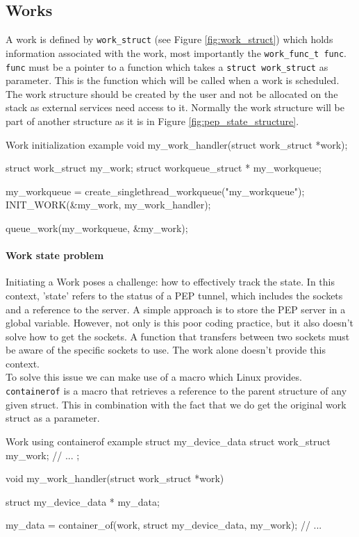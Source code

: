 \documentclass[a4paper,english, 11pt]{report}
\begin{document}
\subsection{Works}
A work is defined by \verb|work_struct| (see Figure \ref{fig:work_struct}) which holds information associated with the work, most importantly the \verb|work_func_t func|. \verb|func| must be a pointer to a function which takes a \verb|struct work_struct| as parameter. This is the function which will be called when a work is scheduled. The work structure should be created by the user and not be allocated on the stack as external services need access to it. Normally the work structure will be part of another structure as it is in Figure \ref{fig:pep_state_structure}.\\


\begin{autonumlstlisting}[label=lst:work_init]{Work initialization example}
void my_work_handler(struct work_struct *work);

struct work_struct my_work;
struct workqueue_struct * my_workqueue;

my_workqueue = create_singlethread_workqueue("my_workqueue");
INIT_WORK(&my_work, my_work_handler);

queue_work(my_workqueue, &my_work);
\end{autonumlstlisting}

\paragraph{Work state problem}
Initiating a Work poses a challenge: how to effectively track the state. In this context, 'state' refers to the status of a PEP tunnel, which includes the sockets and a reference to the server. A simple approach is to store the PEP server in a global variable. However, not only is this poor coding practice, but it also doesn't solve how to get the sockets. A function that transfers between two sockets must be aware of the specific sockets to use. The work alone doesn't provide this context.\\

To solve this issue we can make use of a macro which Linux provides. \verb|containerof| is a macro that retrieves a reference to the parent structure of any given struct. This in combination with the fact that we do get the original work struct as a parameter.\\

\begin{autonumlstlisting}[label=lst:work_containerof]{Work using containerof example}
struct my_device_data {
    struct work_struct my_work;
    // ...
};

void my_work_handler(struct work_struct *work)
{
   struct my_device_data * my_data;

   my_data = container_of(work, struct my_device_data,  my_work);
   // ...
}
\end{autonumlstlisting}
\end{document}

